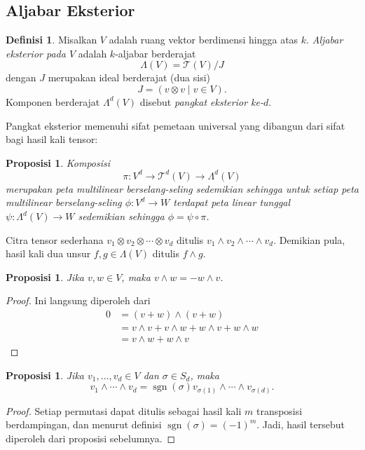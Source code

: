 \documentclass[12pt]{article}
\theoremstyle{plain}
\newtheorem{proposition}[theorem]{Proposisi}
\theoremstyle{definition}
\newtheorem{definition}[theorem]{Definisi}
\theoremstyle{remark}
\numberwithin{equation}{section}
\begin{document}
\subsection{Aljabar Eksterior}

\begin{definition}
Misalkan $V$ adalah ruang vektor berdimensi hingga atas $k$.
\emph{Aljabar eksterior pada $V$} adalah $k$-aljabar berderajat
\[
\Lambda(V) = \mathcal{T}(V)/J
\]
dengan $J$ merupakan ideal berderajat (dua sisi)
\[
J = ( v \otimes v \mid v \in V ).
\]
Komponen berderajat $\Lambda^d(V)$ disebut
\emph{pangkat eksterior ke-$d$}.
\end{definition}

Pangkat eksterior memenuhi sifat pemetaan universal yang dibangun dari
sifat bagi hasil kali tensor:

\begin{proposition}
Komposisi
\[
\pi : V^d \to \mathcal{T}^d(V) \to \Lambda^d(V)
\]
merupakan peta multilinear berselang-seling sedemikian sehingga untuk setiap
peta multilinear berselang-seling
$\phi : V^d \to W$ terdapat peta linear tunggal
$\psi : \Lambda^d(V) \to W$
sedemikian sehingga
$\phi = \psi \circ \pi$.
\end{proposition}

Citra tensor sederhana $v_1 \otimes v_2 \otimes \cdots \otimes v_d$
ditulis $v_1 \wedge v_2 \wedge \cdots \wedge v_d$.
Demikian pula, hasil kali dua unsur $f,g \in \Lambda(V)$
ditulis $f \wedge g$.

\begin{proposition}
Jika $v,w \in V$, maka $v \wedge w = -w \wedge v$.
\end{proposition}

\begin{proof}
Ini langsung diperoleh dari
\begin{align*}
0 &= (v+w) \wedge (v+w)\\
&=v \wedge v + v \wedge w + w \wedge v + w \wedge w\\
&=v \wedge w + w \wedge v
\end{align*}
\end{proof}

\begin{proposition}
Jika $v_1,\ldots,v_d \in V$ dan $\sigma \in S_d$,
maka
\[v_1 \wedge \cdots \wedge v_d =
\operatorname{sgn}(\sigma)
v_{\sigma(1)} \wedge \cdots \wedge v_{\sigma(d)}.
\]
\end{proposition}

\begin{proof}
Setiap permutasi dapat ditulis sebagai hasil kali $m$ transposisi
berdampingan, dan menurut definisi $\operatorname{sgn}(\sigma)=(-1)^m$.
Jadi, hasil tersebut diperoleh dari proposisi sebelumnya.
\end{proof}
\end{document}

